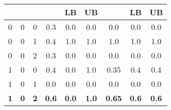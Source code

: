 \begin{figure}[h]
\begin{minipage}[b]{0.55\textwidth}
{\begin{tabular}{|c|c|c|c|cc|c|cc|}
                                &                                 &                 &                     & \multicolumn{1}{c|}{\textbf{LB}}                             & \textbf{UB}                            &                                      & \multicolumn{1}{c|}{\textbf{LB}}                              & \textbf{UB}                             \\ \hline
0                               & 0                               & 0      & 0.3                             & \multicolumn{1}{c|}{0.0}                                     & 0.0                                    & 0.0                                  & \multicolumn{1}{c|}{0.0}                                      & 0.0                                     \\ \hline
0                               & 0                               & 1      & 0.4                             & \multicolumn{1}{c|}{1.0}                                     & 1.0                                    & 1.0                                  & \multicolumn{1}{c|}{1.0}                                      & 1.0                                     \\ \hline
0                               & 0                               & 2      & 0.3                              & \multicolumn{1}{c|}{0.0}                                     & 0.0                                    & 0.0                                  & \multicolumn{1}{c|}{0.0}                                      & 0.0                                     \\ \hline
1                               & 0                               & 0           & 0.4                        & \multicolumn{1}{c|}{0.0}                                     & 1.0                                    & 0.35                                 & \multicolumn{1}{c|}{0.4}                                      & 0.4                                     \\ \hline
1                               & 0                               & 1      & 0.0                             & \multicolumn{1}{c|}{0.0}                                     & 0.0                                    & 0.0                                  & \multicolumn{1}{c|}{0.0}                                      & 0.0                                     \\ \hline
\textbf{1}                      & \textbf{0}                      & \textbf{2}          & \textbf{0.6}                & \multicolumn{1}{c|}{\textbf{0.0}}                            & \textbf{1.0}                           & \textbf{0.65}                        & \multicolumn{1}{c|}{\textbf{0.6}}                             & \textbf{0.6}                            \\ \hline

\end{tabular}}
\end{minipage}
\end{figure}
